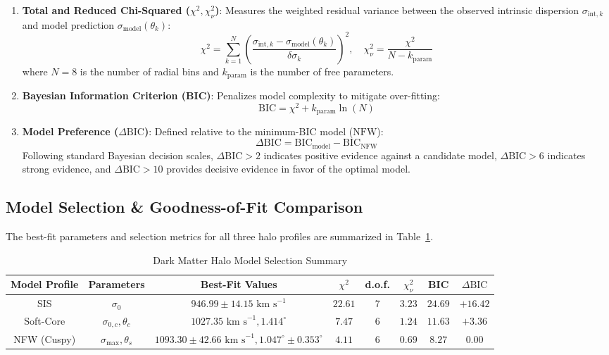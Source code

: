 \documentclass[twocolumn]{aastex631}
\begin{document}
\begin{enumerate}
	\item \textbf{Total and Reduced Chi-Squared ($\chi^2, \chi_\nu^2$)}: Measures the weighted residual variance between the observed intrinsic dispersion $\sigma_{\text{int}, k}$ and model prediction $\sigma_{\text{model}}(\theta_k)$:
	      \begin{equation}
		      \chi^2 = \sum_{k=1}^{N} \left( \frac{\sigma_{\text{int}, k} - \sigma_{\text{model}}(\theta_k)}{\delta \sigma_k} \right)^2, \quad \chi_\nu^2 = \frac{\chi^2}{N - k_{\text{param}}}
	      \end{equation}
	      where $N=8$ is the number of radial bins and $k_{\text{param}}$ is the number of free parameters.

	\item \textbf{Bayesian Information Criterion (BIC)}: Penalizes model complexity to mitigate over-fitting:
	      \begin{equation}
		      \text{BIC} = \chi^2 + k_{\text{param}} \ln(N)
	      \end{equation}

	\item \textbf{Model Preference ($\Delta \text{BIC}$)}: Defined relative to the minimum-BIC model ($\text{NFW}$):
	      \begin{equation}
		      \Delta \text{BIC} = \text{BIC}_{\text{model}} - \text{BIC}_{\text{NFW}}
	      \end{equation}
	      Following standard Bayesian decision scales, $\Delta \text{BIC} > 2$ indicates positive evidence against a candidate model, $\Delta \text{BIC} > 6$ indicates strong evidence, and $\Delta \text{BIC} > 10$ provides decisive evidence in favor of the optimal model.
\end{enumerate}

\subsection{Model Selection \& Goodness-of-Fit Comparison}

The best-fit parameters and selection metrics for all three halo profiles are summarized in Table~\ref{tab:model_comparison}.

\begin{table}[ht!]
	\centering
	\caption{Dark Matter Halo Model Selection Summary}
	\label{tab:model_comparison}
	\begin{tabular}{cccccccc}
		\hline \hline
		Model Profile & Parameters & Best-Fit Values & $\chi^2$ & d.o.f. & $\chi_\nu^2$ & BIC & $\Delta \text{BIC}$ \\
		\hline
		SIS & $\sigma_0$ & $946.99 \pm 14.15 \text{ km s}^{-1}$ & $22.61$ & 7 & $3.23$ & $24.69$ & $+16.42$ \\
		Soft-Core & $\sigma_{0,c}, \theta_c$ & $1027.35 \text{ km s}^{-1}, 1.414^\circ$ & $7.47$ & 6 & $1.24$ & $11.63$ & $+3.36$ \\
		NFW (Cuspy) & $\sigma_{\text{max}}, \theta_s$ & $1093.30 \pm 42.66 \text{ km s}^{-1}, 1.047^\circ \pm 0.353^\circ$ & $4.11$ & 6 & $0.69$ & $8.27$ & $0.00$ \\
		\hline
	\end{tabular}
\end{table}
\end{document}
